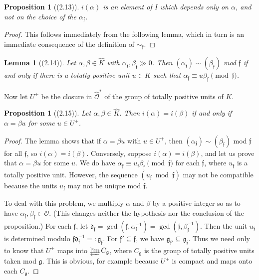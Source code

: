 \documentclass[12pt,a4paper]{article}
\theoremstyle{plain}
\newtheorem{lemma}[theorem]{Lemma}
\newtheorem{proposition}[theorem]{Proposition}
\theoremstyle{definition}
\newcommand{\OO}{\mathcal{O}}
\newcommand{\ff}{\mathfrak{f}}
\begin{document}
\begin{proposition}[(2.13)]\label{prop:i}
$i(\alpha)$ is an element of $I$ which depends only on $\alpha$, and not on the choice of the $\alpha_{\ff}$.
\end{proposition}

\begin{proof}
This follows immediately from the following lemma, which in turn is an immediate consequence of the definition of $\sim_{\ff}$.
\end{proof}

\begin{lemma}[(2.14)]\label{lem:unit}
Let $\alpha,\beta\in\hat{K}$ with $\alpha_{\ff},\beta_{\ff}\gg0$. Then $(\alpha_{\ff})\sim(\beta_{\ff})$ mod $\ff$ if and only if there is a totally positive unit $u\in K$ such that $\alpha_{\ff}\equiv u\beta_{\ff}\pmod{\ff}$.
\end{lemma}

Now let $U^+$ be the closure in $\hat{\OO}^*$ of the group of totally positive units of $K$.

\begin{proposition}[(2.15)]\label{prop:kernel}
Let $\alpha,\beta\in\hat{K}$. Then $i(\alpha)=i(\beta)$ if and only if $\alpha=\beta u$ for some $u\in U^+$.
\end{proposition}

\begin{proof}
The lemma shows that if $\alpha=\beta u$ with $u\in U^+$, then $(\alpha_{\ff})\sim(\beta_{\ff})$ mod $\ff$ for all $\ff$, so $i(\alpha)=i(\beta)$. Conversely, suppose $i(\alpha)=i(\beta)$, and let us prove that $\alpha=\beta u$ for some $u$. We do have $\alpha_{\ff}\equiv u_{\ff}\beta_{\ff}\pmod{\ff}$ for each $\ff$, where $u_{\ff}$ is a totally positive unit. However, the sequence $(u_{\ff}\bmod\ff)$ may not be compatible because the units $u_{\ff}$ may not be unique mod $\ff$.

To deal with this problem, we multiply $\alpha$ and $\beta$ by a positive integer so as to have $\alpha_{\ff},\beta_{\ff}\in\OO$. (This changes neither the hypothesis nor the conclusion of the proposition.) For each $\ff$, let $\mathfrak{d}_{\ff}=\gcd(\ff,\alpha_{\ff}^{-1})=\gcd(\ff,\beta_{\ff}^{-1})$. Then the unit $u_{\ff}$ is determined modulo $\ff\mathfrak{d}_{\ff}^{-1}=:\mathfrak{g}_{\ff}$. For $\ff'\subseteq\ff$, we have $\mathfrak{g}_{\ff'}\subseteq\mathfrak{g}_{\ff}$. Thus we need only to know that $U^+$ maps into $\varprojlim C_{\mathfrak{g}}$, where $C_{\mathfrak{g}}$ is the group of totally positive units taken mod $\mathfrak{g}$. This is obvious, for example because $U^+$ is compact and maps onto each $C_{\mathfrak{g}}$.
\end{proof}
\end{document}

